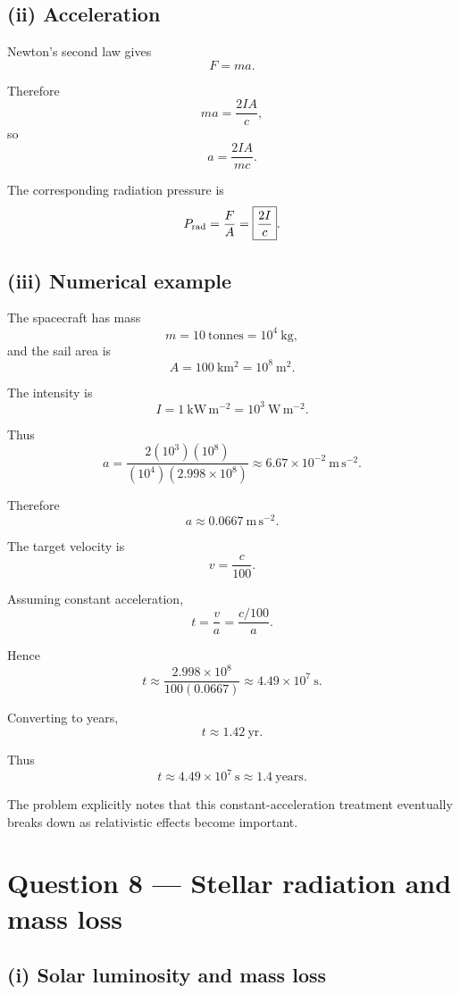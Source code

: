 \documentclass[11pt,a4paper]{article}
\begin{document}
\subsection{(ii) Acceleration}

Newton's second law gives
\[
F=ma.
\]

Therefore
\[
ma=\frac{2IA}{c},
\]
so
\[
\boxed{
a=\frac{2IA}{mc}
}.
\]

The corresponding radiation pressure is
\[
P_{\rm rad}=\frac FA=\boxed{\frac{2I}{c}}.
\]

\subsection{(iii) Numerical example}

The spacecraft has mass
\[
m=10\ \mathrm{tonnes}=10^4\ \mathrm{kg},
\]
and the sail area is
\[
A=100\ \mathrm{km^2}=10^8\ \mathrm{m^2}.
\]

The intensity is
\[
I=1\ \mathrm{kW\,m^{-2}}=10^3\ \mathrm{W\,m^{-2}}.
\]

Thus
\[
a
=
\frac{2(10^3)(10^8)}
{(10^4)(2.998\times10^8)}
\approx6.67\times10^{-2}\ \mathrm{m\,s^{-2}}.
\]

Therefore
\[
\boxed{a\approx0.0667\ \mathrm{m\,s^{-2}}}.
\]

The target velocity is
\[
v=\frac{c}{100}.
\]

Assuming constant acceleration,
\[
t=\frac va
=
\frac{c/100}{a}.
\]

Hence
\[
t
\approx
\frac{2.998\times10^8}
{100(0.0667)}
\approx4.49\times10^7\ \mathrm s.
\]

Converting to years,
\[
t\approx1.42\ \mathrm{yr}.
\]

Thus
\[
\boxed{t\approx4.49\times10^7\ \mathrm s\approx1.4\ \mathrm{years}}.
\]

The problem explicitly notes that this constant-acceleration treatment eventually
breaks down as relativistic effects become important.

\section{Question 8 --- Stellar radiation and mass loss}

\subsection{(i) Solar luminosity and mass loss}
\end{document}
